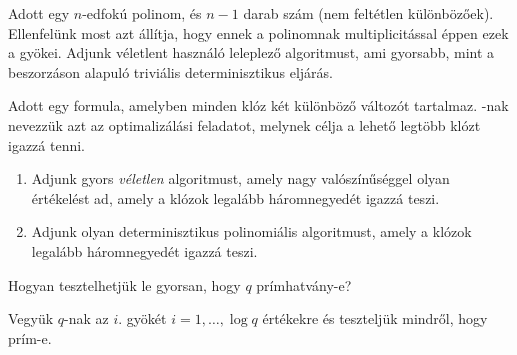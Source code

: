 \begin{Exercise}[counter={sorszam}, difficulty=-1]
	Adott egy $n$-edfokú polinom, és $n-1$ darab szám (nem feltétlen
	különbözőek). Ellenfelünk most azt állítja, hogy ennek a polinomnak
	multiplicitással éppen ezek a gyökei. Adjunk véletlent használó
	leleplező algoritmust, ami gyorsabb, mint a beszorzáson alapuló
	triviális determinisztikus eljárás.
\end{Exercise}


\begin{Exercise}[counter={sorszam}, difficulty=0]
	Adott egy  formula, amelyben minden klóz két különböző változót
	tartalmaz. -nak nevezzük azt az optimalizálási feladatot, melynek célja
	a lehető legtöbb klózt igazzá tenni.
	\begin{enumerate}
		\item Adjunk gyors \emph{véletlen} algoritmust, amely nagy
		valószínűséggel olyan értékelést ad, amely a klózok legalább háromnegyedét
		igazzá teszi.
		\item Adjunk olyan determinisztikus polinomiális
		algoritmust, amely a klózok legalább háromnegyedét igazzá teszi.
	\end{enumerate}
\end{Exercise}

\begin{Exercise}[counter={sorszam}, difficulty=0]
	Hogyan tesztelhetj\"uk le gyorsan, hogy $q$ pr\'imhatv\'any-e?
\end{Exercise}	
\begin{Answer}
	Vegy\"uk $q$-nak az $i.$ gy\"ok\'et $i=1,\ldots,\log q$ \'ert\'ekekre \'es tesztelj\"uk mindr\H ol, hogy pr\'im-e.
\end{Answer}


